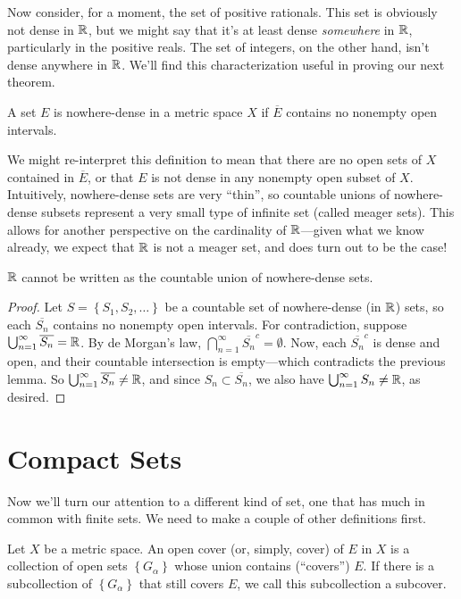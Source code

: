 \documentclass[../m131main.tex]{subfiles}
\begin{document}
Now consider, for a moment, the set of positive rationals.
This set is obviously not dense in $\mathbb{R}$, but we might say that it's at least dense \textit{somewhere} in $\mathbb{R}$, particularly in the positive reals.
The set of integers, on the other hand, isn't dense anywhere in $\mathbb{R}$.
We'll find this characterization useful in proving our next theorem.

\begin{definition}
    A set $E$ is nowhere-dense in a metric space $X$ if $\overline{E}$ contains no nonempty open intervals.
\end{definition}

We might re-interpret this definition to mean that there are no open sets of $X$ contained in $\overline{E}$, or that $E$ is not dense in any nonempty open subset of $X$.
Intuitively, nowhere-dense sets are very ``thin'', so countable unions of nowhere-dense subsets represent a very small type of infinite set (called meager sets).
This allows for another perspective on the cardinality of $\mathbb{R}$---given what we know already, we expect that $\mathbb{R}$ is not a meager set, and does turn out to be the case!

\begin{theorem}
    $\mathbb{R}$ cannot be written as the countable union of nowhere-dense sets.
\end{theorem}

\begin{proof}
    Let $S = \left\{ S_1, S_2, \ldots \right\}$ be a countable set of nowhere-dense (in $\mathbb{R}$) sets, so each $\overline{S_n}$ contains no nonempty open intervals.
    For contradiction, suppose $\bigcup_{n=1}^\infty \overline{S_n} = \mathbb{R}$.
    By de Morgan's law, $\bigcap_{n=1}^\infty \overline{S_n}^c = \emptyset$.
    Now, each $\overline{S_n}^c$ is dense and open, and their countable intersection is empty---which contradicts the previous lemma.
    So $\bigcup_{n=1}^\infty \overline{S_n} \neq \mathbb{R}$, and since $S_n \subset \overline{S_n}$, we also have $\bigcup_{n=1}^\infty S_n \neq \mathbb{R}$, as desired.
\end{proof}

\section{Compact Sets}
Now we'll turn our attention to a different kind of set, one that has much in common with finite sets.
We need to make a couple of other definitions first.

\begin{definition}[Cover]
    Let $X$ be a metric space.
    An open cover (or, simply, cover) of $E$ in $X$ is a collection of open sets $\left\{ G_\alpha \right\}$ whose union contains (``covers'') $E$.
    If there is a subcollection of $\left\{ G_\alpha \right\}$ that still covers $E$, we call this subcollection a subcover.
\end{definition}
\end{document}
